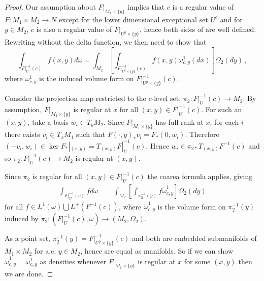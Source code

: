 \begin{proof}
Our assumption about $F|_{M_1\times\{y\}}$ implies that $c$ is a regular value of $F:M_1\times M_2\rightarrow N$ except for the lower dimensional exceptional set $U^c$ and for $y\in M_2$, $c$ is also a regular value of $F|_{U^y\times\{y\}}$, hence both sides of  are well defined. Rewriting  without the delta function, we then need to show that 
\begin{equation}
\int_{F|_U^{-1}(c)} f(x,y) d\omega=\int_{M_2}\left[\int_{F|_{U^y\times\{y\}}^{-1}(c)} f(x,y) \omega^1_{c,y}(dx)\right]\Omega_2(dy)\,,
\end{equation}
where $\omega^1_{c,y}$ is the induced volume form on $F|_{U^y\times\{y\}}^{-1}(c)$. 

Consider the projection map restricted to the $c$-level set, $\pi_2:F|_U^{-1}(c)\rightarrow M_2$. By assumption, $F|_{M_1\times\{y\}}$ is regular at $x$ for all $(x,y)\in F|_U^{-1}(c)$. For such an $(x,y)$, take a basis $w_i\in T_yM_2$. Since $F|_{M_1\times\{y\}}$ has full rank at $x$, for each $i$ there exists $v_i\in T_xM_1$ such that $F(\cdot,y)_*v_i=F_*(0,w_i)$. Therefore $(-v_i,w_i)\in \ker F_*|_{(x,y)}=T_{(x,y)}F|_U^{-1}(c)$. Hence $w_i\in\pi_{2*} T_{(x,y)}F^{-1}(c)$ and so $\pi_2:F|_U^{-1}(c)\rightarrow M_2$ is regular at $(x,y)$. 

Since $\pi_2$ is regular for all $(x,y)\in F|_U^{-1}(c)$ the coarea formula applies, giving
\begin{align}
\int_{F|_U^{-1}(c)}f d\omega=&\int_{M_2}\left[\int_{\pi_2^{-1}(y)}f\tilde{\omega}_{c,y}^1\right]\Omega_2(dy)
\end{align}
for all $f\in L^1(\omega)\bigcup L^+(F^{-1}(c))$, where $\tilde{\omega}_{c,y}^1$ is the volume form on $\pi_2^{-1}(y)$ induced by $\pi_2:(F|_U^{-1}(c),\omega)\rightarrow (M_2,\Omega_2)$.

As a point set, $\pi_2^{-1}(y)=F|_{ U^y\times\{y\}}^{-1}(c)$ and both are embedded submanifolds of $M_1\times M_2$ for a.e. $y\in M_2$, hence are equal as manifolds. So if we can show $\tilde{\omega}_{c,y}^1=\omega^1_{c,y}$ as densities whenever $F|_{M_1\times\{y\}}$ is regular at $x$ for some $(x,y)$ then we are done. 


\end{proof}
